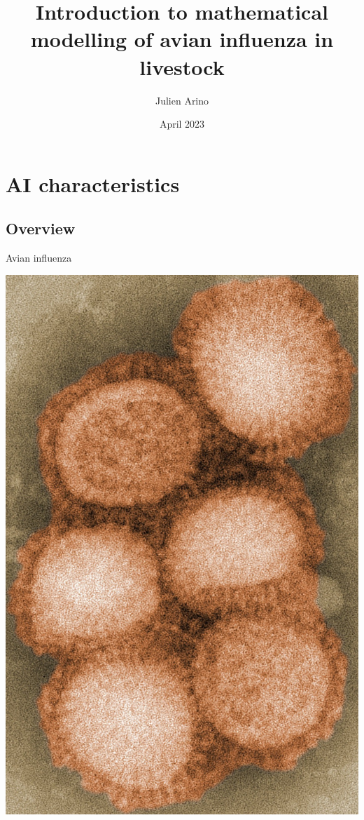 \documentclass[aspectratio=43]{beamer}
\title{Introduction to mathematical modelling of avian influenza in livestock}
\author{Julien Arino}
\date{April 2023}
\begin{document}

\begin{frame}
  \titlepage
\end{frame}
\addtocounter{page}{-1}


\section{AI characteristics}

\subsection{Overview}

\begin{frame}{Avian influenza}
  \begin{minipage}{0.4\textwidth}
    \includegraphics[width=1.1\textwidth]{../FIGS/H1N1_navbox}

\end{minipage}
\end{frame}
\end{document}
